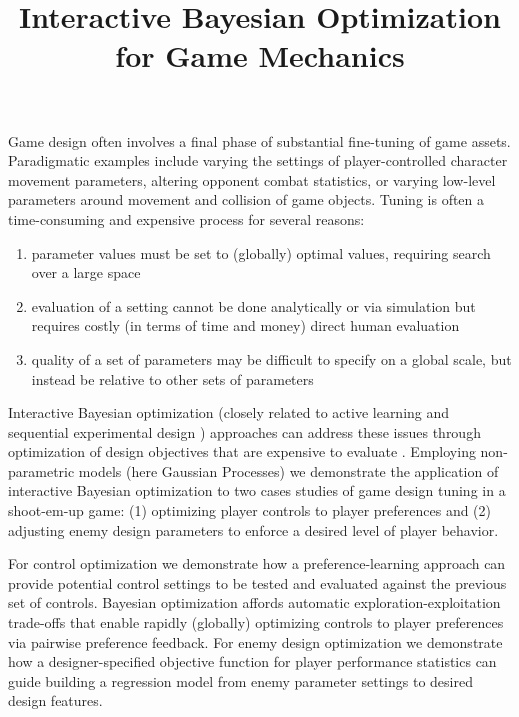 \documentclass[letterpaper]{article}
\begin{document}
%
\title{Interactive Bayesian Optimization for Game Mechanics}
\author{
}



\maketitle
\begin{abstract}
\begin{quote}
\end{quote}
\end{abstract}

\noindent Game design often involves a final phase of substantial fine-tuning of game assets. Paradigmatic examples include varying the settings of player-controlled character movement parameters, altering opponent combat statistics, or varying low-level parameters around movement and collision of game objects. Tuning is often a time-consuming and expensive process for several reasons:
\begin{enumerate}
\item parameter values must be set to (globally) optimal values, requiring search over a large space
\item evaluation of a setting cannot be done analytically or via simulation but requires costly (in terms of time and money) direct human evaluation
\item quality of a set of parameters may be difficult to specify on a global scale, but instead be relative to other sets of parameters
\end{enumerate}

Interactive Bayesian optimization (closely related to active learning \cite{settles2012:al-book} and sequential experimental design \cite{chaloner1995}) approaches can address these issues through optimization of design objectives that are expensive to evaluate \cite{brochu2010:thesis}. Employing non-parametric models (here Gaussian Processes) we demonstrate the application of interactive Bayesian optimization to two cases studies of game design tuning in a shoot-em-up game: (1) optimizing player controls to player preferences and (2) adjusting enemy design parameters to enforce a desired level of player behavior.

For control optimization we demonstrate how a preference-learning approach can provide potential control settings to be tested and evaluated against the previous set of controls. Bayesian optimization affords automatic exploration-exploitation trade-offs that enable rapidly (globally) optimizing controls to player preferences via pairwise preference feedback. For enemy design optimization we demonstrate how a designer-specified objective function for player performance statistics can guide building a regression model from enemy parameter settings to desired design features.
\end{document}
